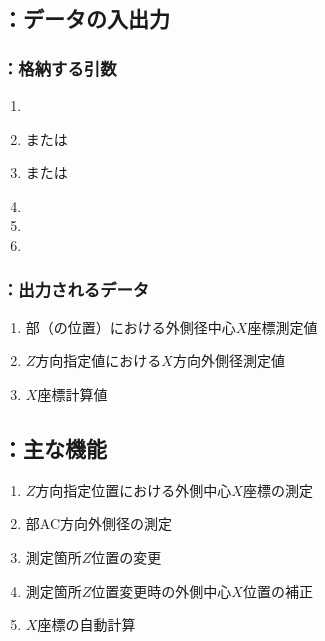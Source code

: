 \subsection{\MXOThickness：データの入出力}

\subsubsection{\MXOThickness：格納する引数}
\begin{enumerate}[label*=\sarrow]
\item \PMACOD
\item \PMTopReAlocationLength または\PMBottomReAlocationLength
\item \PMTopAlocationLength または\PMBottomAlocationLength
\item \PMCenterCurvatureRadius
\item \PMKeywayPos
\item \PMKeywayWidth
\end{enumerate}

\subsubsection{\MXOThickness：出力されるデータ}
\begin{enumerate}[label*=\sarrow]
\item \EndFace 部（\ReAlocationLength の位置）における外側径中心$X$座標測定値
\item $Z$方向指定値における$X$方向外側径測定値
\item \KeywayCenter$X$座標計算値
\end{enumerate}



\subsection{\MXOThickness：主な機能}
\begin{enumerate}[label*=\sarrow]
\item $Z$方向指定位置における外側中心$X$座標の測定
\item \EndFace 部AC方向外側径の測定
\item 測定箇所$Z$位置の変更
\item 測定箇所$Z$位置変更時の外側中心$X$位置の補正
\item \KeywayCenter$X$座標の自動計算
\end{enumerate}


